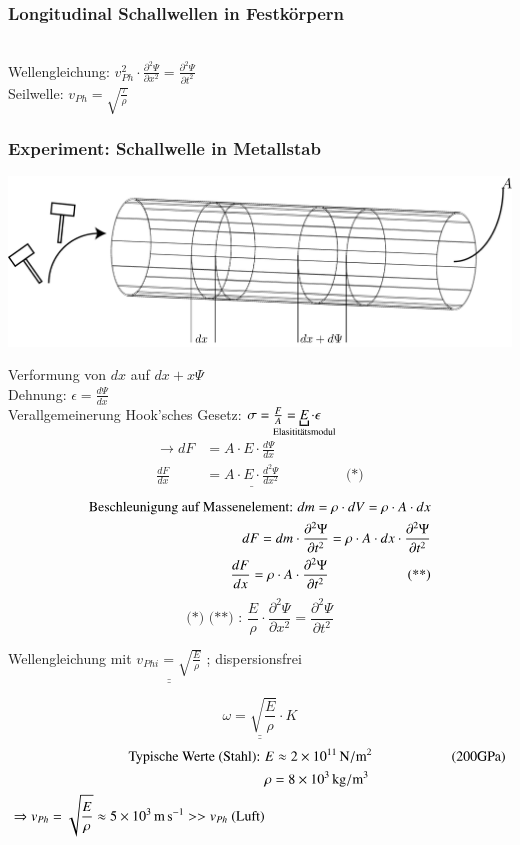 \subsubsection{Longitudinal Schallwellen in Festkörpern}\hfill\\
Wellengleichung: $ v_{Ph}^2 \cdot \frac{\partial^2\Psi}{\partial x^2} = \frac{\partial^2\Psi}{\partial t^2} $\\
Seilwelle: $ v_{Ph} = \sqrt{\frac{\tau}{\rho}} $\\
\subsubsection{Experiment: Schallwelle in Metallstab}
\enter
\begin{center}
	\includegraphics[width=0.7\linewidth]{skizzen/19/19B25}
\end{center}
Verformung von $ dx $ auf $ dx+x\Psi $\\
Dehnung: $ \epsilon = \frac{d\Psi}{dx} $\\
Verallgemeinerung Hook'sches Gesetz: $ \sigma = \frac{F}{A} = \underbracket{E}_{\mathclap{\text{Elasititätsmodul}}} \cdot \epsilon$\\
\begin{align*}
\rightarrow dF &= A \cdot E \cdot \frac{d\Psi}{dx}\\
\frac{dF}{dx} &= \underline{A \cdot E \cdot \frac{d^2\Psi}{dx^2}} \hspace{2cm} \text{(*)}
\end{align*}
\begin{align*}
\text{Beschleunigung auf Massenelement: }  dm = \rho\cdot dV = \rho\cdot A \cdot dx \\
dF = dm \cdot \frac{\partial^2\Psi}{\partial t^2} = \rho \cdot A \cdot dx \cdot \frac{\partial^2\Psi}{\partial t^2}\\
\frac{dF}{dx} = \rho \cdot A \cdot \frac{\partial^2\Psi}{\partial t^2} \hspace{2cm} \text{(**)}
\enter
\end{align*}
$$ \text{(*) (**) : } \boxed{\frac{E}{\rho} \cdot \frac{\partial^2\Psi}{\partial x^2} =  \frac{\partial^2 \Psi}{\partial t^2}} $$
\begin{center}
	Wellengleichung mit $ \underline{\underline{v_{Phi} = \sqrt{\frac{E}{\rho}}}} $ ; dispersionsfrei
\end{center}
$$ \underline{\underline{\omega = \sqrt{\frac{E}{\rho}} \cdot K}} $$
\begin{align*}
\text{Typische Werte (Stahl): } &E \approx \SI{2E11}{\newton\per\meter^2} \hspace{2cm} (200\si{\giga\pascal}) \\
&\rho = \SI{8E3}{\kilogram\per\meter^3}\\
\Rightarrow v_{Ph} = \sqrt{\frac{E}{\rho}} \approx \SI{5E3}{\meter\per\second} >> v_{Ph} \text{ (Luft)}
\end{align*}

